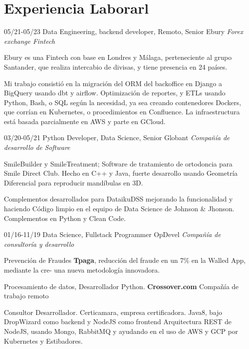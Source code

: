 \section{Experiencia Laborarl}

\begin{entrylist}
  \entry
    {05/21-05/23}       
    {Data Engineering, backend developer, Remoto, Senior}
    {Ebury {\sl Forex exchange Fintech}}
    {Ebury es una Fintech con base en Londres y Málaga, perteneciente al grupo Santander, que realiza intercabio
	de divisas, y tiene presencia en 24 países.

     Mi trabajo consistió en la migración del ORM del backoffice en Django a BigQuery usando dbt y airflow. Optimización de reportes, y ETLs usando Python, Bash, o SQL según la necesidad, ya sea creando contenedores Dockers, que corrían en Kubernetes, o procedimientos en Confluence. La infraestructura está basada parcialmente en AWS y parte en GCloud.}
  \entry
    {03/20-05/21}
    {Python Developer, Data Science, Senior}
    {Globant {\sl Compañía de desarrollo de Software}}
	{SmileBuilder y SmileTreatment; Software de tratamiento de ortodoncia para Smile Direct Club. Hecho en C++ y Java, fuerte desarrollo usando Geometría Diferencial para reproducir mandíbulas en 3D.

Complementos desarrollados para DataikuDSS mejorando la funcionalidad y haciendo
Código limpio en el equipo de Data Science de Johnson \& Jhonson. Complementos en Python y Clean Code.}
  \entry
    {01/16-11/19}
    {Data Science, Fullstack Programmer}
    {OpDevel {\sl Compañía de consultoría y desarrollo}}
    {Prevención de Fraudes \textbf{Tpaga}, reducción del fraude en un 7\% en la Walled App, mediante la cre-
una nueva metodología innovadora.

Procesamiento de datos, Desarrollador Python. \textbf{Crossover.com} Compañía de trabajo remoto

Consultor Desarrollador. Certicamara, empresa certificadora. Java8, bajo
DropWizard como backend y NodeJS como frontend Arquitectura REST de NodeJS,
usando Mongo, RabbitMQ y ayudando en el uso de AWS y GCP por Kubernetes
y Estibadores.}
\end{entrylist}

\newpage


